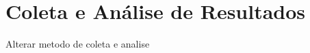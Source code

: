 \section{Coleta e Análise de Resultados}

{\color{red} Alterar metodo de coleta e analise}
%
%
%
%
%
%
%
%
